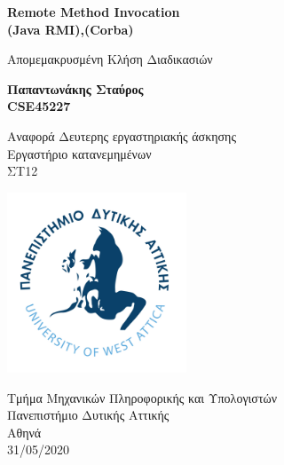 %
%
%
\begin{titlepage}
	\begin{center}
		\vspace{1cm}	
		\Huge	
		\textbf{ Remote Method Invocation  \\  (Java RMI),(Corba)}
		
		\vspace{0.5cm}
		\large
		Απομεμακρυσμένη Κλήση Διαδικασιών
		
		\vspace{1.5cm}
		\textbf{Παπαντωνάκης Σταύρος\\ CSE45227}
		\vfill
		
		Αναφορά Δευτερης εργαστηριακής άσκησης\\
		Εργαστήριο κατανεμημένων\\
		ΣΤ12
		
		\vspace{0.8cm}
		\begin{center}
			\includegraphics[width=0.4\textwidth]{image/logo.jpg}		
		\end{center}
		\normalsize
		Τμήμα Μηχανικών Πληροφορικής και Υπολογιστών\\
		Πανεπιστήμιο Δυτικής Αττικής\\
		Αθηνά\\
		31/05/2020\\	
	\end{center}
\end{titlepage}